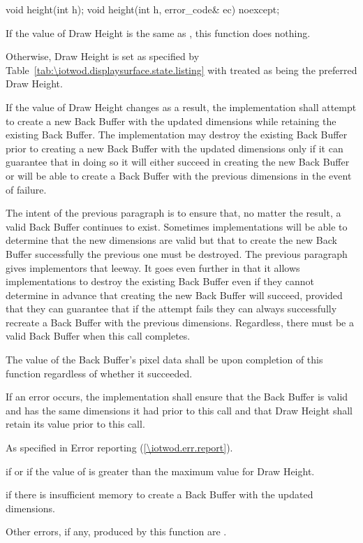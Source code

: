 \begin{itemdecl}
void height(int h);
void height(int h, error_code& ec) noexcept;
\end{itemdecl}
\begin{itemdescr}
\pnum
\effects
If the value of Draw Height is the same as , this function does nothing.

\pnum
Otherwise, Draw Height is set as specified by Table~\ref{tab:\iotwod.displaysurface.state.listing} with  treated as being the preferred Draw Height.

\pnum
If the value of Draw Height changes as a result, the implementation shall attempt to create a new Back Buffer with the updated dimensions while retaining the existing Back Buffer. The implementation may destroy the existing Back Buffer prior to creating a new Back Buffer with the updated dimensions only if it can guarantee that in doing so it will either succeed in creating the new Back Buffer or will be able to create a Back Buffer with the previous dimensions in the event of failure.

\pnum
\begin{note}
The intent of the previous paragraph is to ensure that, no matter the result, a valid Back Buffer continues to exist. Sometimes implementations will be able to determine that the new dimensions are valid but that to create the new Back Buffer successfully the previous one must be destroyed. The previous paragraph gives implementors that leeway. It goes even further in that it allows implementations to destroy the existing Back Buffer even if they cannot determine in advance that creating the new Back Buffer will succeed, provided that they can guarantee that if the attempt fails they can always successfully recreate a Back Buffer with the previous dimensions. Regardless, there must be a valid Back Buffer when this call completes.
\end{note}

\pnum
The value of the Back Buffer's pixel data shall be \unspecnorm upon completion of this function regardless of whether it succeeded.

\pnum
If an error occurs, the implementation shall ensure that the Back Buffer is valid and has the same dimensions it had prior to this call and that Draw Height shall retain its value prior to this call.

\pnum
\throws
As specified in Error reporting (\ref{\iotwod.err.report}).

\pnum
\errors
{} if  or if the value of  is greater than the maximum value for Draw Height.

 if there is insufficient memory to create a Back Buffer with the updated dimensions.

Other errors, if any, produced by this function are .
\end{itemdescr}

